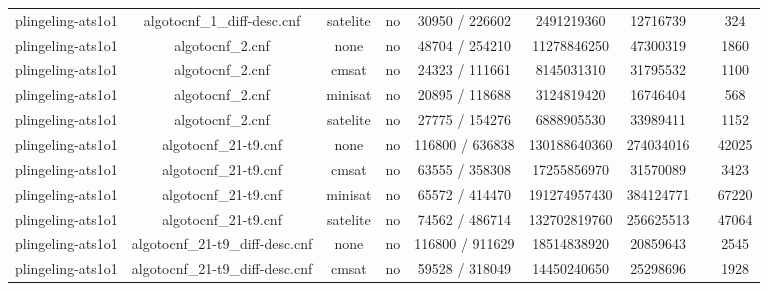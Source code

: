 \begin{appendices}
\begin{table}[p]
\begin{center}
\begin{tabular}{l|cccccccc}
  plingeling-ats1o1              & algotocnf\_1\_diff-desc.cnf    & satelite   & no    & 30950 / 226602 & 2491219360 & 12716739  &            & 324 \\ %
  plingeling-ats1o1              & algotocnf\_2.cnf               & none       & no    & 48704 / 254210 & 11278846250 & 47300319  &            & 1860 \\ %
  plingeling-ats1o1              & algotocnf\_2.cnf               & cmsat      & no    & 24323 / 111661 & 8145031310 & 31795532  &            & 1100 \\ %
  plingeling-ats1o1              & algotocnf\_2.cnf               & minisat    & no    & 20895 / 118688 & 3124819420 & 16746404  &            & 568 \\ %
  plingeling-ats1o1              & algotocnf\_2.cnf               & satelite   & no    & 27775 / 154276 & 6888905530 & 33989411  &            & 1152 \\ %
  plingeling-ats1o1              & algotocnf\_21-t9.cnf           & none       & no    & 116800 / 636838 & 130188640360 & 274034016 &            & 42025 \\ %
  plingeling-ats1o1              & algotocnf\_21-t9.cnf           & cmsat      & no    & 63555 / 358308 & 17255856970 & 31570089  &            & 3423 \\ %
  plingeling-ats1o1              & algotocnf\_21-t9.cnf           & minisat    & no    & 65572 / 414470 & 191274957430 & 384124771 &            & 67220 \\ %
  plingeling-ats1o1              & algotocnf\_21-t9.cnf           & satelite   & no    & 74562 / 486714 & 132702819760 & 256625513 &            & 47064 \\ %
  plingeling-ats1o1              & algotocnf\_21-t9\_diff-desc.cnf & none       & no    & 116800 / 911629 & 18514838920 & 20859643  &            & 2545 \\ %
  plingeling-ats1o1              & algotocnf\_21-t9\_diff-desc.cnf & cmsat      & no    & 59528 / 318049 & 14450240650 & 25298696  &            & 1928 \\ %

\end{tabular}
\end{center}
\end{table}
\end{appendices}
